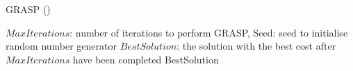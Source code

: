 \begin{algorithm}[H] 
\caption{GRASP (\cite{feo_greedy_1995})}
\label{alg:grasp}
\begin{algorithmic}[1]
\Require $Max$\textunderscore$Iterations$: number of iterations to perform GRASP, Seed: seed to initialise random number generator
\Ensure $Best$\textunderscore$Solution$: the solution with the best cost after $Max$\textunderscore$Iterations$ have been completed
    \EndFor
    \State \Return Best\textunderscore Solution
\EndProcedure
\end{algorithmic}
\end{algorithm}
